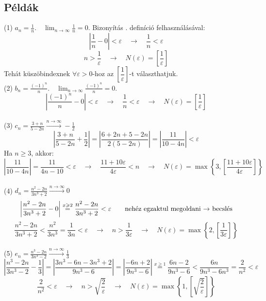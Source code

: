 \documentclass[a4paper,12pt,twoside]{book}
\theoremstyle{break}
\theoremstyle{plain}
\begin{document}
\subsection{Példák}

(1) $\displaystyle a_n = \frac{1}{n}. \quad \lim_{n\to\infty} \frac{1}{n} = 0$. Bizonyítás . definíció felhasználásával:
\[\left|\frac{1}{n}-0\right|<\varepsilon \quad\rightarrow\quad \frac{1}{n}<\varepsilon\]
\[n>\frac{1}{\varepsilon} \quad\rightarrow\quad N(\varepsilon)=\left[\frac{1}{\varepsilon}\right]\]
Tehát küszöbindexnek $\forall\varepsilon>0$-hoz az $\left[\dfrac{1}{\varepsilon}\right]$-t választhatjuk.\\

(2) $\displaystyle b_n = \frac{(-1)^n}{n}. \quad \lim_{n\to\infty} \frac{(-1)^n}{n} = 0$.
\[\left|\frac{(-1)^n}{n}-0\right|<\varepsilon \quad\rightarrow\quad \frac{1}{n}<\varepsilon \quad\rightarrow\quad N(\varepsilon)=\left[\frac{1}{\varepsilon}\right]\]\\

(3) $\displaystyle c_n = \frac{3+n}{5-2n} \xrightarrow{n\to\infty} -\frac{1}{2}$
\[\left|\frac{3+n}{5-2n}+\frac{1}{2}\right|=\left|\frac{6+2n+5-2n}{2(5-2n)}\right|=\left|\frac{11}{10-4n}\right|<\varepsilon\]
Ha $n\geqslant 3$, akkor:
\[\left|\frac{11}{10-4n}\right|=\frac{11}{4n-10}<\varepsilon \quad\rightarrow\quad \frac{11+10\varepsilon}{4\varepsilon}<n \quad\rightarrow\quad N(\varepsilon)=\max\left\{3, \left[\frac{11+10\varepsilon}{4\varepsilon}\right]\right\}\]\\

(4) $\displaystyle d_n = \frac{n^2-2n}{3n^3+2} \xrightarrow{n\to\infty} 0$
\[\left|\frac{n^2-2n}{3n^3+2}-0\right|\overset{x\geqslant 2}{=}\frac{n^2-2n}{3n^3+2}<\varepsilon \qquad \hbox{nehéz egzaktul megoldani $\rightarrow$ becslés}\]
\[\frac{n^2-2n}{3n^3+2} < \frac{n^2}{3n^3} = \frac{1}{3n} < \varepsilon \quad\rightarrow\quad n > \frac{1}{3\varepsilon}  \quad\rightarrow\quad N(\varepsilon)=\max\left\{2, \left[\frac{1}{3\varepsilon}\right]\right\}\]\\

(5) $\displaystyle e_n = \frac{n^3-2n}{3n^3-2} \xrightarrow{n\to\infty} \frac{1}{3}$
\[\left|\frac{n^3-2n}{3n^3-2}-\frac{1}{3}\right|=\left|\frac{3n^3-6n-3n^3+2}{9n^3-6}\right|=\left|\frac{-6n+2}{9n^3-6}\right|\overset{x\geqslant 1}{=}\frac{6n-2}{9n^3-6}<\frac{6n}{9n^3-6n^3}=\frac{2}{n^2}<\varepsilon\]
\[\frac{2}{n^2}<\varepsilon \quad\rightarrow\quad n > \sqrt{\frac{2}{\varepsilon}} \quad\rightarrow\quad N(\varepsilon)=\max\left\{1, \left[\sqrt{\frac{2}{\varepsilon}}\right]\right\}\]
\end{document}

